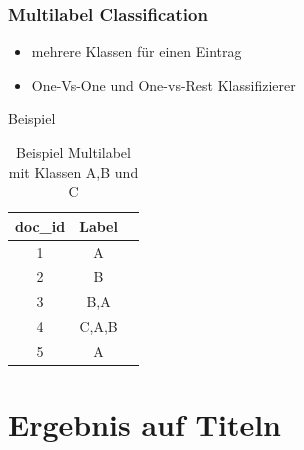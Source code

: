 \documentclass[12pt, xcolor=table]{beamer}
\begin{document}
\begin{frame}
    \frametitle{Multilabel Classification}
    \begin{itemize}
        \item mehrere Klassen für einen Eintrag
        \item One-Vs-One und One-vs-Rest Klassifizierer
    \end{itemize}
    \begin{block}{Beispiel}
    \begin{center}
    \begin{table}
        \begin{tabular}{ccc}
            \tiny\textbf{doc\_id} &\tiny \textbf{Label}  \\
            \hline
            \tiny 1 &\tiny A  \\
            \tiny 2 &\tiny B  \\
            \tiny 3 &\tiny B,A  \\
            \tiny 4 &\tiny C,A,B  \\
            \tiny 5 &\tiny A  \\
        \end{tabular}
         \caption*{Beispiel Multilabel mit Klassen A,B und C}
    \end{table}
    \end{center}
    \end{block}
\end{frame}

\section{Ergebnis auf Titeln} %
\label{sec:Ergebnis}
\end{document}
